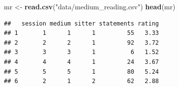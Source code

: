 \documentclass[
]{book}
\newenvironment{Shaded}{\begin{snugshade}}{\end{snugshade}}
\newcommand{\FunctionTok}[1]{\textcolor[rgb]{0.13,0.29,0.53}{\textbf{#1}}}
\newcommand{\NormalTok}[1]{#1}
\newcommand{\OtherTok}[1]{\textcolor[rgb]{0.56,0.35,0.01}{#1}}
\newcommand{\StringTok}[1]{\textcolor[rgb]{0.31,0.60,0.02}{#1}}
\begin{document}
\begin{Shaded}
\begin{Highlighting}[]
\NormalTok{mr }\OtherTok{\textless{}{-}} \FunctionTok{read.csv}\NormalTok{(}\StringTok{"data/medium\_reading.csv"}\NormalTok{)}
\FunctionTok{head}\NormalTok{(mr)}
\end{Highlighting}
\end{Shaded}

\begin{verbatim}
##   session medium sitter statements rating
## 1       1      1      1         55   3.33
## 2       2      2      1         92   3.72
## 3       3      3      1          6   1.52
## 4       4      4      1         24   3.67
## 5       5      5      1         80   5.24
## 6       2      1      2         62   2.88
\end{verbatim}
\end{document}
